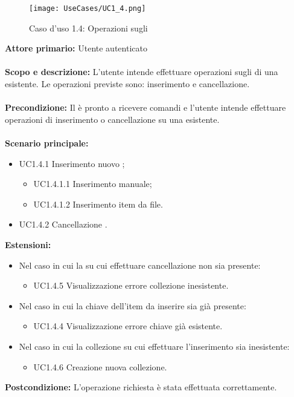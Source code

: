 \documentclass{scalatekids-article}
\begin{document}
\begin{figure}[H]
  \begin{center}
    \texttt{[image: UseCases/UC1\_4.png]}
    \caption*{Caso d'uso 1.4: Operazioni sugli }
  \end{center}
\end{figure}
\textbf{Attore primario:} Utente autenticato\\ \\
\textbf{Scopo e descrizione:} L'utente intende effettuare operazioni sugli  di una  esistente. Le operazioni previste sono:
inserimento e cancellazione.\\ \\
\textbf{Precondizione:} Il  è pronto a ricevere comandi e l'utente intende effettuare operazioni di inserimento o cancellazione su una  esistente.\\ \\
\textbf{Scenario principale:}
\begin{itemize}
\item UC1.4.1 Inserimento nuovo ;
  \begin{itemize}
  \item UC1.4.1.1 Inserimento  manuale;
  \item UC1.4.1.2 Inserimento  item da file.
  \end{itemize}
\item UC1.4.2 Cancellazione .
\end{itemize}
\textbf{Estensioni:}
\begin{itemize}
\item Nel caso in cui la  su cui effettuare cancellazione non sia presente:
  \begin{itemize}
  \item UC1.4.5 Visualizzazione errore collezione inesistente.
  \end{itemize}
\item Nel caso in cui la chiave dell'item da inserire sia già presente:
  \begin{itemize}
  \item UC1.4.4 Visualizzazione errore chiave già esistente.
  \end{itemize}
\item Nel caso in cui la collezione su cui effettuare l'inserimento sia inesistente:
  \begin{itemize}
  \item UC1.4.6 Creazione nuova collezione.
  \end{itemize}
\end{itemize}
\textbf{Postcondizione:} L'operazione richiesta è stata effettuata correttamente.
\end{document}
